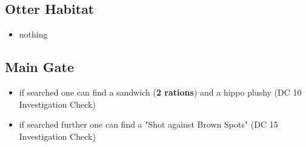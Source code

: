 \subsection*{ Otter Habitat}
\begin{itemize}
	\item nothing
\end{itemize}
\subsection*{ Main Gate}
\begin{itemize}
	\item if searched one can find a sandwich (\textbf{2 rations}) and a hippo plushy (DC 10 Investigation Check)
	\item if searched further one can find a "Shot against Brown Spots" (DC 15 Investigation Check)
\end{itemize}
